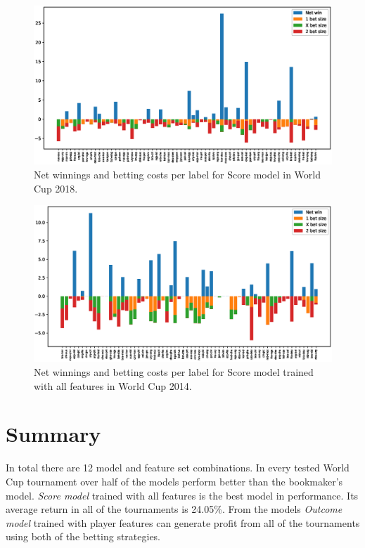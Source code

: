 \begin{figure}[H]
    \centering
    \includegraphics[width=1\textwidth]{img/match_level_2018_score_win_cost_.eps}
    \caption{Net winnings and betting costs per label for Score model in World Cup 2018.}
    \label{fig:net_win_cost_2018}
\end{figure}

\begin{figure}[H]
    \centering
    \includegraphics[width=1\textwidth]{img/match_level_2014_score_win_cost_.eps}
    \caption{Net winnings and betting costs per label for Score model trained with all features in World Cup 2014.}
    \label{fig:net_win_cost_2014}
\end{figure}

\section{Summary}
In total there are 12 model and feature set combinations. In every tested World Cup tournament over half of the models perform better than the bookmaker's model. \textit{Score model} trained with all features is the best model in performance. Its average return in all of the tournaments is 24.05\%. From the models \textit{Outcome model} trained with player features can generate profit from all of the tournaments using both of the betting strategies.

